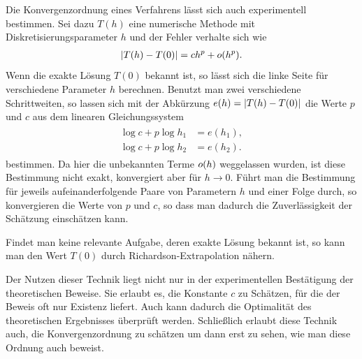 \begin{remark}
  Die Konvergenzordnung eines Verfahrens lässt sich auch experimentell
  bestimmen. Sei dazu $T(h)$ eine numerische Methode mit
  Diskretisierungsparameter $h$ und der Fehler verhalte sich wie
  \begin{gather}
    \lvert T(h) - T(0)\rvert = c h^p + o(h^p).
  \end{gather}
  Wenn die exakte Lösung $T(0)$ bekannt ist, so lässt sich die linke
  Seite für verschiedene Parameter $h$ berechnen. Benutzt man zwei
  verschiedene Schrittweiten, so lassen sich mit der Abkürzung
  $e(h) = \lvert T(h) - T(0)\rvert$ die Werte $p$ und $c$ aus dem
  linearen Gleichungssystem
  \begin{gather}
    \begin{aligned}
      \log c + p \log h_1 &= e(h_1),\\
      \log c + p \log h_2 &= e(h_2).
    \end{aligned}
  \end{gather}
  bestimmen. Da hier die unbekannten Terme $o(h)$ weggelassen
  wurden, ist diese Bestimmung nicht exakt, konvergiert aber für
  $h\to 0$. Führt man die Bestimmung für jeweils aufeinanderfolgende
  Paare von Parametern $h$ und einer Folge durch, so konvergieren die
  Werte von $p$ und $c$, so dass man dadurch die Zuverlässigkeit der
  Schätzung einschätzen kann.

  Findet man keine relevante Aufgabe, deren exakte Lösung bekannt ist,
  so kann man den Wert $T(0)$ durch Richardson-Extrapolation nähern.

  Der Nutzen dieser Technik liegt nicht nur in der experimentellen
  Bestätigung der theoretischen Beweise. Sie erlaubt es, die Konstante
  $c$ zu Schätzen, für die der Beweis oft nur Existenz liefert. Auch
  kann dadurch die Optimalität des theoretischen Ergebnisses überprüft
  werden. Schließlich erlaubt diese Technik auch, die
  Konvergenzordnung zu schätzen um dann erst zu sehen, wie man diese
  Ordnung auch beweist.
\end{remark}



